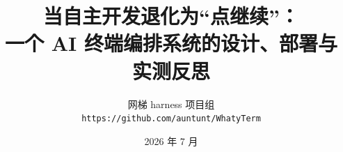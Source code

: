 \documentclass[10pt,twocolumn]{ctexart}
\title{\bfseries 当自主开发退化为“点继续”：\\一个 AI 终端编排系统的设计、部署与实测反思}
\author{网梯 harness 项目组\\ \small \texttt{https://github.com/auntunt/WhatyTerm}}
\date{2026 年 7 月}
\begin{document}
\maketitle

\begin{abstract}

\end{abstract}














\end{document}
